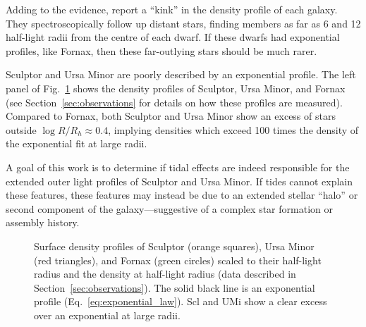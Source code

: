 Adding to the evidence, \citet{sestito+2023a, sestito+2023b} report a
``kink'' in the density profile of each galaxy. They spectroscopically
follow up distant stars, finding members as far as 6 and 12 half-light
radii from the centre of each dwarf. If these dwarfs had exponential
profiles, like Fornax, then these far-outlying stars should be much
rarer.

Sculptor and Ursa Minor are poorly described by an exponential profile.
The left panel of Fig.~\ref{fig:scl_umi_vs_fornax} shows the density
profiles of Sculptor, Ursa Minor, and Fornax (see
Section~\ref{sec:observations} for details on how these profiles are
measured). Compared to Fornax, both Sculptor and Ursa Minor show an
excess of stars outside \(\log R/R_h\approx 0.4\), implying densities
which exceed 100 times the density of the exponential fit at large
radii.

A goal of this work is to determine if tidal effects are indeed
responsible for the extended outer light profiles of Sculptor and Ursa
Minor. If tides cannot explain these features, these features may
instead be due to an extended stellar ``halo'' or second component of
the galaxy---suggestive of a complex star formation or assembly history.

\begin{figure}
\centering
{}
\caption[The extended stellar profiles of Sculptor and Ursa
Minor]{Surface density profiles of Sculptor (orange squares), Ursa Minor
(red triangles), and Fornax (green circles) scaled to their half-light
radius and the density at half-light radius (data described in
Section~\ref{sec:observations}). The solid black line is an exponential
profile (Eq.~\ref{eq:exponential_law}). Scl and UMi show a clear excess
over an exponential at large radii.}\label{fig:scl_umi_vs_fornax}
\end{figure}

